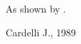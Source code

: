\documentclass{article}
\begin{document}
As shown by \cite{c_89}.
\begin{thebibliography}{}
 Cardelli J., 1989
\end{thebibliography}
\end{document}
